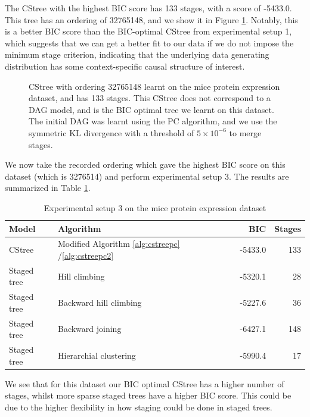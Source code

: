 \documentclass{tufte-book}
\begin{document}
The CStree with the highest BIC score has 133 stages, with a score of -5433.0. This tree has an ordering of 32765148, and we show it in Figure \ref{fig:micemaxbic}. Notably, this is a better BIC score than the BIC-optimal CStree from experimental setup 1, which suggests that we can get a better fit to our data if we do not impose the minimum stage criterion, indicating that the underlying data generating distribution has some context-specific causal structure of interest.


\begin{figure}[!h]\label{fig:micemaxbic}
   \begin{floatrow}
%
\caption{CStree with ordering 32765148 learnt on the mice protein expression dataset, and has 133 stages. This CStree does not correspond to a DAG model, and is the BIC optimal tree we learnt on this dataset. The initial DAG was learnt using the PC algorithm, and we use the symmetric KL divergence with a threshold of $5\times 10^{-6}$ to merge stages.}
        
   \end{floatrow}
\end{figure}

We now take the recorded ordering which gave the highest BIC score on this dataset (which is 3276514) and perform experimental setup 3. The results are summarized in Table \ref{tab:orgf113a02}.

\begin{table}[htbp]
\caption{\label{tab:orgf113a02}Experimental setup 3 on the mice protein expression dataset}
\centering
\begin{tabular}{l|l|r|r}
\hline
Model & Algorithm & BIC & Stages\\
\hline
CStree & Modified Algorithm \ref{alg:cstreepc} /\ref{alg:cstreepc2} & -5433.0 & 133\\
Staged tree & Hill climbing & -5320.1 & 28\\
Staged tree & Backward hill climbing & -5227.6 & 36\\
Staged tree & Backward joining & -6427.1 & 148\\
Staged tree & Hierarchial clustering & -5990.4 & 17\\
\end{tabular}
\end{table}

We see that for this dataset our BIC optimal CStree has a higher number of stages, whilst more sparse staged trees have a higher BIC score. This could be due to the higher flexibility in how staging could be done in staged trees.
\end{document}
